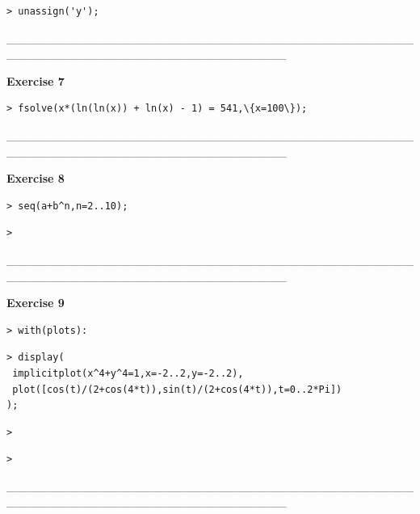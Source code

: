 \documentclass{article}
\begin{document}
\begin{lstlisting}
> unassign('y');
\end{lstlisting}
\begin{Maple Normal}
\_\_\_\_\_\_\_\_\_\_\_\_\_\_\_\_\_\_\_\_\_\_\_\_\_\_\_\_\_\_\_\_\_\_\_\_\_\_\_\_\_\_\_\_\_\_\_\_\_\_\_\_\_\_\_\_\_\_\_\_\_\_\_\_\_\_\_\_\_\_\_\_\_\_\_\_\_\_\_\_\_
\end{Maple Normal}
\begin{Maple Normal}
\textbf{Exercise 7}
\end{Maple Normal}
\begin{lstlisting}
> fsolve(x*(ln(ln(x)) + ln(x) - 1) = 541,\{x=100\});
\end{lstlisting}
\begin{Maple Normal}
\_\_\_\_\_\_\_\_\_\_\_\_\_\_\_\_\_\_\_\_\_\_\_\_\_\_\_\_\_\_\_\_\_\_\_\_\_\_\_\_\_\_\_\_\_\_\_\_\_\_\_\_\_\_\_\_\_\_\_\_\_\_\_\_\_\_\_\_\_\_\_\_\_\_\_\_\_\_\_\_\_
\end{Maple Normal}
\begin{Maple Normal}
\textbf{Exercise 8}
\end{Maple Normal}
\begin{lstlisting}
> seq(a+b^n,n=2..10);
\end{lstlisting}
\begin{lstlisting}
> 
\end{lstlisting}
\begin{Maple Normal}
\_\_\_\_\_\_\_\_\_\_\_\_\_\_\_\_\_\_\_\_\_\_\_\_\_\_\_\_\_\_\_\_\_\_\_\_\_\_\_\_\_\_\_\_\_\_\_\_\_\_\_\_\_\_\_\_\_\_\_\_\_\_\_\_\_\_\_\_\_\_\_\_\_\_\_\_\_\_\_\_\_
\end{Maple Normal}
\begin{Maple Normal}
\textbf{Exercise 9}
\end{Maple Normal}
\begin{lstlisting}
> with(plots):
\end{lstlisting}
\begin{lstlisting}
> display(
 implicitplot(x^4+y^4=1,x=-2..2,y=-2..2),
 plot([cos(t)/(2+cos(4*t)),sin(t)/(2+cos(4*t)),t=0..2*Pi])
);
\end{lstlisting}
\begin{lstlisting}
> 
\end{lstlisting}
\begin{lstlisting}
> 
\end{lstlisting}
\begin{Maple Normal}
\_\_\_\_\_\_\_\_\_\_\_\_\_\_\_\_\_\_\_\_\_\_\_\_\_\_\_\_\_\_\_\_\_\_\_\_\_\_\_\_\_\_\_\_\_\_\_\_\_\_\_\_\_\_\_\_\_\_\_\_\_\_\_\_\_\_\_\_\_\_\_\_\_\_\_\_\_\_\_\_\_
\end{Maple Normal}
\end{document}
